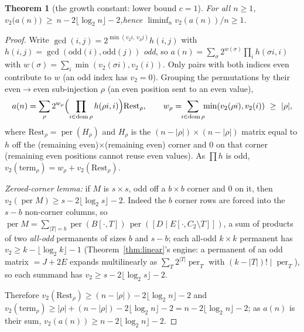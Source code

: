\documentclass[11pt]{article}
\newtheorem{theorem}{Theorem}
\theoremstyle{remark}\newtheorem{remark}[theorem]{Remark}
\DeclareMathOperator{\perm}{per}
\begin{document}
\begin{theorem}[the growth constant: lower bound $c=1$]\label{thm:c1}
For all $n\ge1$,\quad $v_2\bigl(a(n)\bigr)\ \ge\ n-2\lfloor\log_2 n\rfloor-2$,\quad hence
$\liminf_n v_2(a(n))/n\ge1$.
\end{theorem}
\begin{proof}
Write $\gcd(i,j)=2^{\min(v_2 i,\,v_2 j)}h(i,j)$ with $h(i,j)=\gcd(\mathrm{odd}(i),\mathrm{odd}(j))$
\emph{odd}, so $a(n)=\sum_\sigma 2^{w(\sigma)}\prod_i h(\sigma i,i)$ with
$w(\sigma)=\sum_i\min(v_2(\sigma i),v_2(i))$. Only pairs with both indices even contribute to $w$
(an odd index has $v_2=0$). Grouping the permutations by their even$\to$even sub-injection
$\rho$ (an even position sent to an even value),
\[
  a(n)=\sum_\rho 2^{w_\rho}\Bigl(\prod_{i\in\mathrm{dom}\,\rho}h(\rho i,i)\Bigr)\mathrm{Rest}_\rho,
  \qquad w_\rho=\!\!\sum_{i\in\mathrm{dom}\,\rho}\!\!\min(v_2(\rho i),v_2(i))\ \ge\ |\rho|,
\]
where $\mathrm{Rest}_\rho=\perm(H_\rho)$ and $H_\rho$ is the $(n-|\rho|)\times(n-|\rho|)$ matrix
equal to $h$ off the (remaining even)$\times$(remaining even) corner and $0$ on that corner
(remaining even positions cannot reuse even values). As $\prod h$ is odd,
$v_2(\text{term}_\rho)=w_\rho+v_2(\mathrm{Rest}_\rho)$.

\emph{Zeroed-corner lemma:} if $M$ is $s\times s$, odd off a $b\times b$ corner and $0$ on it,
then $v_2(\perm M)\ge s-2\lfloor\log_2 s\rfloor-2$. Indeed the $b$ corner rows are forced into
the $s-b$ non-corner columns, so
$\perm M=\sum_{|T|=b}\perm(B[\cdot,T])\,\perm([D\mid E[\cdot,C_2\!\setminus\!T]])$, a sum of
products of two \emph{all-odd} permanents of sizes $b$ and $s-b$; each all-odd $k\times k$
permanent has $v_2\ge k-\lfloor\log_2 k\rfloor-1$ (Theorem~\ref{thm:linear}'s engine: a
permanent of an odd matrix $=J+2E$ expands multilinearly as $\sum_T 2^{|T|}\perm_T$ with
$(k-|T|)!\mid\perm_T$), so each summand has $v_2\ge s-2\lfloor\log_2 s\rfloor-2$.

Therefore $v_2(\mathrm{Rest}_\rho)\ge(n-|\rho|)-2\lfloor\log_2 n\rfloor-2$ and
$v_2(\text{term}_\rho)\ge|\rho|+(n-|\rho|)-2\lfloor\log_2 n\rfloor-2=n-2\lfloor\log_2 n\rfloor-2$;
as $a(n)$ is their sum, $v_2(a(n))\ge n-2\lfloor\log_2 n\rfloor-2$.
\end{proof}
\end{document}
